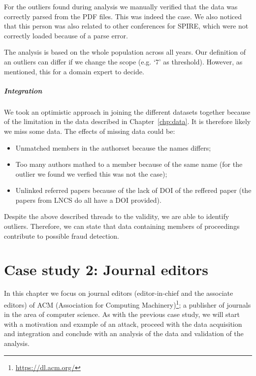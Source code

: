 \documentclass{ou-report}
\begin{document}
For the outliers found during analysis we manually verified that the data was 
correctly parsed from the PDF files. This was
indeed the case. We also noticed that this person was also related to other
conferences
for SPIRE, which were not correctly loaded because of a parse error.

The analysis is based on the whole population across all years. 
Our definition of an outliers can differ if we change the scope (e.g. `7' as 
threshold). However, as mentioned, this for a domain expert to decide.

\paragraph{Integration}
We took an optimistic approach in joining the different datasets together 
because of the limitation in the data described in Chapter~\ref{chp:data}. It
is therefore likely we miss some data. The effects of missing data could be:
\begin{itemize}
    \item Unmatched members in the authorset because the names differs;
    \item Too many authors mathed to a member because of the same name (for
    the outlier we found we verfied this was not the case);
    \item Unlinked referred papers because of the lack of DOI of the reffered 
    paper (the papers from LNCS do all have a DOI provided).
\end{itemize}

Despite the above described threads to the validity, we are able to identify 
outliers. Therefore, we can state that data containing members of proceedings 
contribute to possible fraud detection.


\chapter{Case study 2: Journal editors}
\label{chp:case2}
In this chapter we focus on journal editors (editor-in-chief and the associate editors) of 
ACM (Association for Computing Machinery)\footnote{\url{https://dl.acm.org/}}; 
a publisher of journals in the area of computer science.
As with the previous case study, we will start with a motivation and example of
an attack, proceed with the data acquisition and integration and conclude with
an analysis of the data and validation of the analysis.
\end{document}
